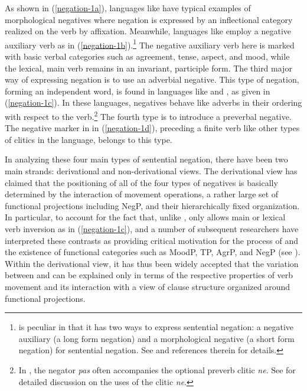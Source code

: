 \documentclass[output=paper,biblatex,babelshorthands,newtxmath,draftmode,colorlinks,citecolor=brown]{langscibook}
\begin{document}
\noindent
As shown in (\ref{negation-1a}), languages like 
have typical examples of morphological negatives where
negation is expressed by an inflectional category realized on the
verb by affixation. Meanwhile, languages like 
 employ a negative auxiliary verb as in (\ref{negation-1b}).\footnote{
 is peculiar in that it has two ways to
 express sentential negation: a negative auxiliary (a long form
 negation)  and a morphological negative (a short form negation)
 for sentential negation. See \citet{Kim:00,Kim:16} and references therein for details.}
  The negative auxiliary
 verb here is marked with basic verbal categories such as agreement, tense, aspect, and mood, while the lexical, main verb remains in an invariant, participle form. The third major way of expressing negation is to use an adverbial
negative. This type of negation, forming an independent word, is found in
languages like  and , as given in (\ref{negation-1c}). In these languages, negatives behave like adverbs in their ordering with respect to the verb.\footnote{In , the negator \emph{pas}
often accompanies the optional preverb clitic \emph{ne}. See \citet{Godard:2004} for detailed discussion on the uses of the clitic \emph{ne}.} The fourth
type is to introduce a preverbal negative. The negative marker in  in (\ref{negation-1d}), preceding a finite verb like other types of clitics in the language,
belongs to this type.


In analyzing these four main types of sentential negation, there have been two main strands: derivational and non-derivational views. The derivational view has claimed that the positioning of all of the
four types of negatives is basically determined by the interaction of movement
operations, a rather large set of functional projections including NegP,
and their hierarchically fixed organization.
In particular, to account for the
fact that, unlike , only  allows main or lexical verb inversion
as in (\ref{negation-1c}), \citet{Pollock:89,Pollock:94} and a number of subsequent researchers
have interpreted these contrasts as providing critical motivation for
the process of  and the existence of functional
categories such as MoodP, TP, AgrP, and NegP (see \citealt{Belletti:90, Zanuttini:97,Chomsky:91,Chomsky:93,Lasnik:95, Haegeman:95,Haegeman:97, Vikner97a-u, Zanuttini:2001, Zeijlstra:15}).
Within the derivational view, it has thus been widely
accepted that the variation between  and  can be explained only in terms of the respective properties of verb movement and its interaction with a view of clause
structure organized around functional projections.
\end{document}
